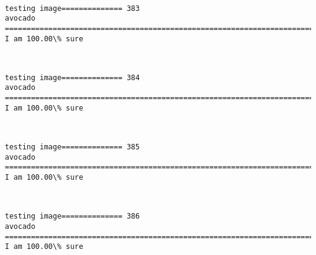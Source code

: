 \documentclass[11pt]{article}
\begin{document}
    \begin{center}
    \end{center}
    { \hspace*{\fill} \\}
    
    \begin{Verbatim}[commandchars=\\\{\}]
testing image============== 383
avocado
============================================================================
I am 100.00\% sure

    \end{Verbatim}

    \begin{center}
    \end{center}
    { \hspace*{\fill} \\}
    
    \begin{Verbatim}[commandchars=\\\{\}]
testing image============== 384
avocado
============================================================================
I am 100.00\% sure

    \end{Verbatim}

    \begin{center}
    \end{center}
    { \hspace*{\fill} \\}
    
    \begin{Verbatim}[commandchars=\\\{\}]
testing image============== 385
avocado
============================================================================
I am 100.00\% sure

    \end{Verbatim}

    \begin{center}
    \end{center}
    { \hspace*{\fill} \\}
    
    \begin{Verbatim}[commandchars=\\\{\}]
testing image============== 386
avocado
============================================================================
I am 100.00\% sure

    \end{Verbatim}
\end{document}
